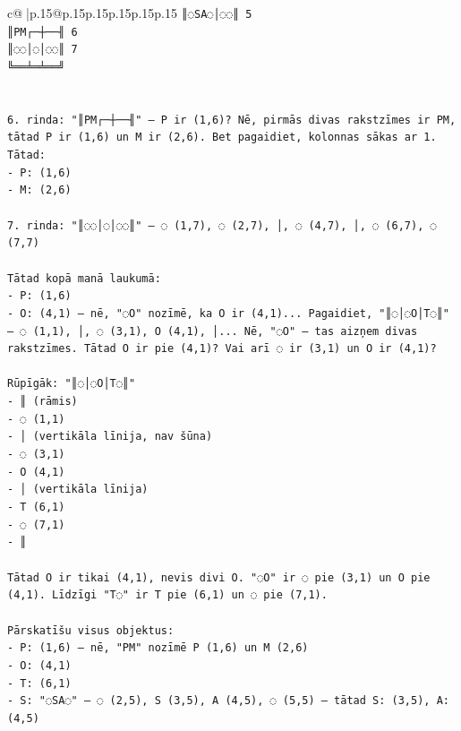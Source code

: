 \documentclass{article}
\begin{document}
{\begin{supertabular}{c@{$\;$}|p{.15\linewidth}@{}p{.15\linewidth}p{.15\linewidth}p{.15\linewidth}p{.15\linewidth}p{.15\linewidth}}
{{{\texttt{║◌SA◌│◌◌║ 5} \\
\texttt{║PM┌─┼──╢ 6} \\
\texttt{║◌◌│◌│◌◌║ 7} \\
\texttt{╚══╧═╧══╝} \\
\\ 
\\ 
\texttt{6. rinda: "║PM┌─┼──╢" — P ir (1,6)? Nē, pirmās divas rakstzīmes ir PM, tātad P ir (1,6) un M ir (2,6). Bet pagaidiet, kolonnas sākas ar 1. Tātad:} \\
\texttt{{-} P: (1,6)} \\
\texttt{{-} M: (2,6)} \\
\\ 
\texttt{7. rinda: "║◌◌│◌│◌◌║" — ◌ (1,7), ◌ (2,7), │, ◌ (4,7), │, ◌ (6,7), ◌ (7,7)} \\
\\ 
\texttt{Tātad kopā manā laukumā:} \\
\texttt{{-} P: (1,6)} \\
\texttt{{-} O: (4,1) — nē, "◌O" nozīmē, ka O ir (4,1)... Pagaidiet, "║◌│◌O│T◌║" — ◌ (1,1), │, ◌ (3,1), O (4,1), │... Nē, "◌O" — tas aizņem divas rakstzīmes. Tātad O ir pie (4,1)? Vai arī ◌ ir (3,1) un O ir (4,1)?} \\
\\ 
\texttt{Rūpīgāk: "║◌│◌O│T◌║"} \\
\texttt{{-} ║ (rāmis)} \\
\texttt{{-} ◌ (1,1)} \\
\texttt{{-} │ (vertikāla līnija, nav šūna)} \\
\texttt{{-} ◌ (3,1)} \\
\texttt{{-} O (4,1)} \\
\texttt{{-} │ (vertikāla līnija)} \\
\texttt{{-} T (6,1)} \\
\texttt{{-} ◌ (7,1)} \\
\texttt{{-} ║} \\
\\ 
\texttt{Tātad O ir tikai (4,1), nevis divi O. "◌O" ir ◌ pie (3,1) un O pie (4,1). Līdzīgi "T◌" ir T pie (6,1) un ◌ pie (7,1).} \\
\\ 
\texttt{Pārskatīšu visus objektus:} \\
\texttt{{-} P: (1,6) — nē, "PM" nozīmē P (1,6) un M (2,6)} \\
\texttt{{-} O: (4,1)} \\
\texttt{{-} T: (6,1)} \\
\texttt{{-} S: "◌SA◌" — ◌ (2,5), S (3,5), A (4,5), ◌ (5,5) — tātad S: (3,5), A: (4,5)} \\
}}}
\end{supertabular}}
\end{document}
